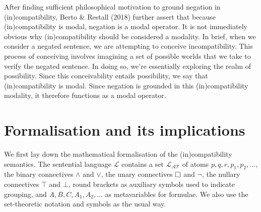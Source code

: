 After finding sufficient philosophical motivation to ground negation in (in)compatibility, Berto \& Restall (2018) further assert that because (in)compatibility is modal, negation is a modal operator. It is not immediately obvious why (in)compatibility should be considered a modality. In brief, when we consider a negated sentence, we are attempting to conceive incompatibility. This process of conceiving involves imagining a set of possible worlds that we take to verify the negated sentence. In doing so, we're essentially exploring the realm of possibility. Since this conceivability entails possibility, we say that (in)compatibility is modal. Since negation is grounded in this (in)compatibility modality, it therefore functions as a modal operator.

\section{Formalisation and its implications}

We first lay down the mathematical formalisation of the (in)compatibility semantics. The sentential language $\mathcal{L}$ contains a set $\mathcal{L_{AT}}$ of atoms $p, q, r, p_1, p_2, \dots$, the binary connectives $\land$ and $\lor$, the unary connectives $\Box$ and $\neg$, the nullary connectives $\top$ and $\bot$, round brackets as auxiliary symbols used to indicate grouping, and $A, B, C, A_1, A_2, \dots$ as metavariables for formulae. We also use the set-theoretic notation and symbols as the usual way.


